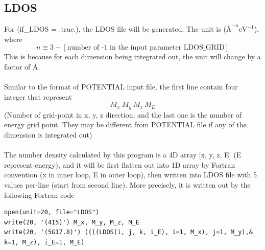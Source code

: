\documentclass[10pt]{article}
\begin{document}
\subsection{LDOS}
For (if{\_}LDOS = .true.), the LDOS file will be generated. The unit is ($\text{\AA}^{-n} \text{eV}^{-1}$), where 
\[n \equiv 3 - [\text{number of -1 in the input parameter LDOS{\_}GRID}]\]
This is because for each dimension being integrated out, the unit will change by a factor of \AA .\\\\
Similar to the format of POTENTIAL input file, the first line contain four integer that represent
\[M_x\ M_y\ M_z\ M_E\]
(Number of grid-point in x, y, z direction, and the last one is the number of energy grid point. They may be different from POTENTIAL file if any of the dimension is integrated out)\\\\
The number density calculated by this program is a 4D array [x, y, z, E] (E represent energy), and it will be first flatten out into 1D array by Fortran convention (x in inner loop, E in outer loop), then written into LDOS file with 5 values per-line (start from second line). More precisely, it is written out by the following Fortran code
\begin{lstlisting}
open(unit=20, file="LDOS")
write(20, '(4I5)') M_x, M_y, M_z, M_E
write(20, '(5G17.8)') ((((LDOS(i, j, k, i_E), i=1, M_x), j=1, M_y),&
k=1, M_z), i_E=1, M_E)
\end{lstlisting}
\end{document}

